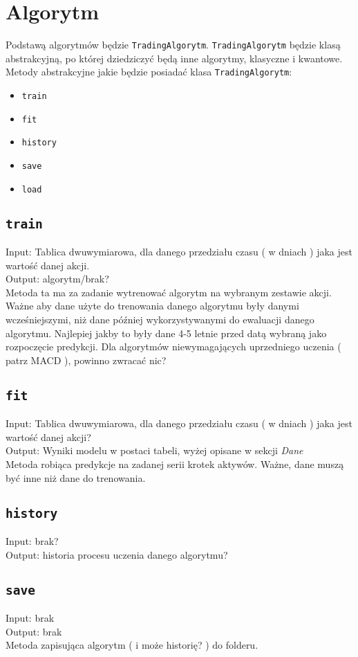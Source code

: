 \documentclass[polish,envcountsect,10pt]{article}
\begin{document}
\section{Algorytm}

Podstawą algorytmów będzie \texttt{TradingAlgorytm}. \texttt{TradingAlgorytm}  będzie klasą abstrakcyjną, po której dziedziczyć będą inne algorytmy, klasyczne i kwantowe.
Metody abstrakcyjne jakie będzie posiadać klasa \texttt{TradingAlgorytm}:
\begin{itemize}
    \item \texttt{train}
    \item\texttt{fit}
    \item \texttt{history}
    \item \texttt{save}
    \item \texttt{load}
\end{itemize}


\subsection{\texttt{train}}
Input: Tablica dwuwymiarowa, dla danego przedziału czasu ( w dniach ) jaka jest wartość danej akcji.\\
Output: algorytm/brak?\\
Metoda ta ma za zadanie wytrenować algorytm na wybranym zestawie akcji. 
Ważne aby dane użyte do trenowania danego algorytmu były danymi wcześniejszymi, niż dane później wykorzystywanymi do ewaluacji danego algorytmu.
Najlepiej jakby to były dane 4-5 letnie przed datą wybraną jako rozpoczęcie predykcji.
Dla algorytmów niewymagających uprzedniego uczenia ( patrz MACD ), powinno zwracać nic?
\subsection{\texttt{fit}}
Input: Tablica dwuwymiarowa, dla danego przedziału czasu ( w dniach ) jaka jest wartość danej akcji?\\
Output: Wyniki modelu w postaci tabeli, wyżej opisane w sekcji \emph{Dane}\\
Metoda robiąca predykcje na zadanej serii krotek aktywów.
Ważne, dane muszą być inne niż dane do trenowania.
\subsection{\texttt{history}}
Input: brak?\\
Output: historia procesu uczenia danego algorytmu?
\subsection{\texttt{save}}
Input: brak\\
Output: brak\\
Metoda zapisująca algorytm ( i może historię? ) do folderu. 
\end{document}
